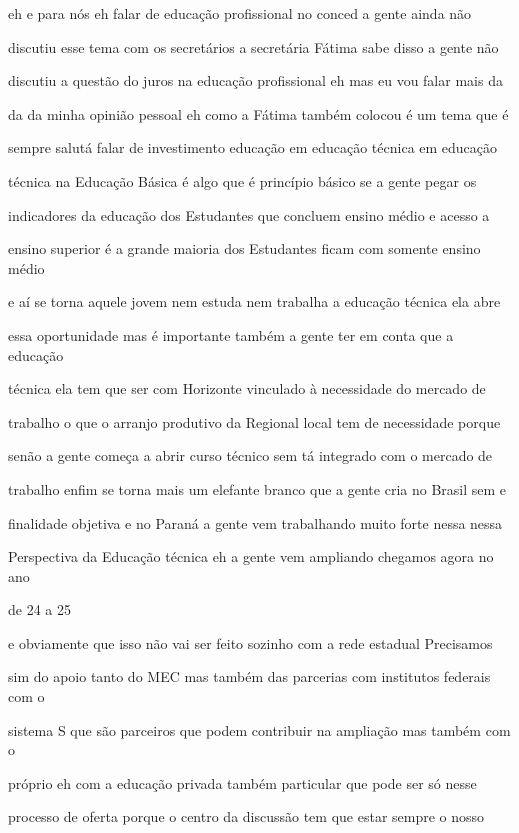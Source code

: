 \documentclass[a4paper,12pt]{article}
\begin{document}
eh e para nós eh falar de educação profissional no conced a gente ainda não

discutiu esse tema com os secretários a secretária Fátima sabe disso a gente não

discutiu a questão do juros na educação profissional eh mas eu vou falar mais da

da da minha opinião pessoal eh como a Fátima também colocou é um tema que é

sempre salutá falar de investimento educação em educação técnica em educação

técnica na Educação Básica é algo que é princípio básico se a gente pegar os

indicadores da educação dos Estudantes que concluem ensino médio e acesso a

ensino superior é a grande maioria dos Estudantes ficam com somente ensino médio

e aí se torna aquele jovem nem estuda nem trabalha a educação técnica ela abre

essa oportunidade mas é importante também a gente ter em conta que a educação

técnica ela tem que ser com Horizonte vinculado à necessidade do mercado de

trabalho o que o arranjo produtivo da Regional local tem de necessidade porque

senão a gente começa a abrir curso técnico sem tá integrado com o mercado de

trabalho enfim se torna mais um elefante branco que a gente cria no Brasil sem e

finalidade objetiva e no Paraná a gente vem trabalhando muito forte nessa nessa

Perspectiva da Educação técnica eh a gente vem ampliando chegamos agora no ano

de 24 a 25%

e obviamente que isso não vai ser feito sozinho com a rede estadual Precisamos

sim do apoio tanto do MEC mas também das parcerias com institutos federais com o

sistema S que são parceiros que podem contribuir na ampliação mas também com o

próprio eh com a educação privada também particular que pode ser só nesse

processo de oferta porque o centro da discussão tem que estar sempre o nosso
\end{document}
